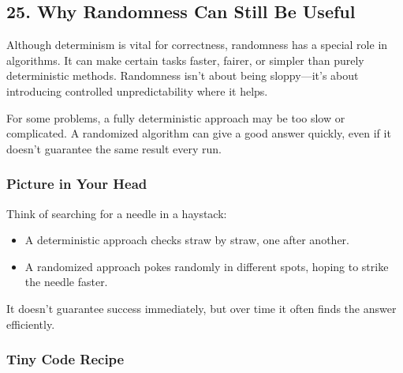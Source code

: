 \documentclass[
  letterpaper,
  DIV=11,
  numbers=noendperiod]{scrreprt}
\providecommand{\tightlist}{%
  \setlength{\itemsep}{0pt}\setlength{\parskip}{0pt}}
\begin{document}
\subsection{25. Why Randomness Can Still Be
Useful}\label{why-randomness-can-still-be-useful}

Although determinism is vital for correctness, randomness has a special
role in algorithms. It can make certain tasks faster, fairer, or simpler
than purely deterministic methods. Randomness isn't about being
sloppy---it's about introducing controlled unpredictability where it
helps.

For some problems, a fully deterministic approach may be too slow or
complicated. A randomized algorithm can give a good answer quickly, even
if it doesn't guarantee the same result every run.

\subsubsection{Picture in Your Head}\label{picture-in-your-head-24}

Think of searching for a needle in a haystack:

\begin{itemize}
\tightlist
\item
  A deterministic approach checks straw by straw, one after another.
\item
  A randomized approach pokes randomly in different spots, hoping to
  strike the needle faster.
\end{itemize}

It doesn't guarantee success immediately, but over time it often finds
the answer efficiently.

\subsubsection{Tiny Code Recipe}\label{tiny-code-recipe-22}
\end{document}
